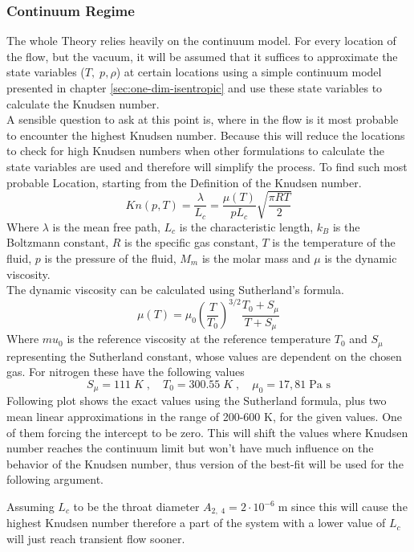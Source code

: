 \subsubsection*{Continuum Regime}
	The whole Theory relies heavily on the continuum model.
	For every location of the flow, but the vacuum, it will be assumed that it suffices to approximate the state variables ($T,\; p, \rho$) at certain locations using a simple continuum model presented in chapter \ref{sec:one-dim-isentropic} and use these state variables to calculate the Knudsen number.\\
	A sensible question to ask at this point is, where in the flow is it most probable to encounter the highest Knudsen number.
	Because this will reduce the locations to check for high Knudsen numbers when other formulations to calculate the state variables are used and therefore will simplify the process.
	To find such most probable Location, starting from the Definition of the Knudsen number.
	$$
		Kn(p,T) = \frac{\lambda}{L_c} = \frac{\mu(T)}{pL_c}\sqrt{\frac{\pi R T}{2}}
	$$
	Where $\lambda$ is the mean free path, $L_c$ is the characteristic length, $k_B$ is the Boltzmann constant, $R$ is the specific gas constant, $T$ is the temperature of the fluid, $p$ is the pressure of the fluid, $M_m$ is the molar mass and $\mu$ is the dynamic viscosity.\\
	The dynamic viscosity can be calculated using Sutherland's formula.
	$$
		\mu(T) = \mu_0 \left(\frac{T}{T_0}\right)^{3/2} \frac{T_0 + S_\mu}{T + S_\mu}
	$$
	Where $mu_0$ is the reference viscosity at the reference temperature $T_0$ and $S_\mu$ representing the Sutherland constant, whose values are dependent on the chosen gas. For nitrogen these have the following values \cite{kim2004numericalanalysisflowcharacteristics}
	$$
		S_\mu = 111\;K\;,\quad T_0 = 300.55\;K\;,\quad\mu_0 = 17,81\; \text{Pa s} 
	$$
	Following plot shows the exact values using the Sutherland formula, plus two mean linear approximations in the range of 200-600 K, for the given values.
	One of them forcing the intercept to be zero.
	This will shift the values where Knudsen number reaches the continuum limit but won't have much influence on the behavior of the Knudsen number, thus version of the best-fit will be used for the following argument.
	
	Assuming $L_c$ to be the throat diameter $A_{2,\;4} = 2 \cdot 10^{-6}\; \text{m}$ since this will cause the highest Knudsen number therefore a part of the system with a lower value of $L_c$ will just reach transient flow sooner.
